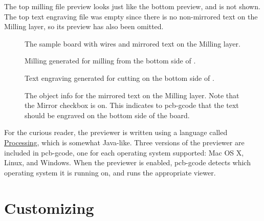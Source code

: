 \documentclass[11pt]{book}
\begin{document}
The top milling file preview looks just like the bottom preview, and is not shown. The top text engraving file was empty since there is no non-mirrored text on the Milling layer, so its preview has also been omitted.

\begin{figure}
	\caption{The sample board  with wires and mirrored text on the Milling layer.}
	\label{fig:014151Board}
\end{figure}

\begin{figure}
	\caption{Milling generated for milling from the bottom side of .}
	\label{fig:BottomMilling}
\end{figure}

\begin{figure}
	\caption{Text engraving generated for cutting on the bottom side of .}
	\label{fig:BottomText}
\end{figure}

\clearpage

\begin{figure}
	\caption{The object info for the mirrored text on the Milling layer. Note that the Mirror checkbox is on. This indicates to pcb-gcode that the text should be engraved on the bottom side of the board.}
	\label{fig:MirroredTextInfo}
\end{figure}


\howitworks{}
For the curious reader, the previewer is written using a language called \href{http://processing.org}{Processing}, which is somewhat Java-like. Three versions of the previewer are included in pcb-gcode, one for each operating system supported: Mac OS X, Linux, and Windows. When the previewer is enabled, pcb-gcode detects which operating system it is running on, and runs the appropriate viewer.

%
\chapter{Customizing}
%
\end{document}
